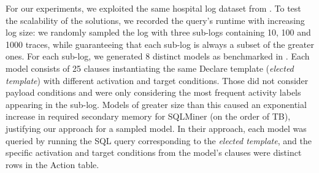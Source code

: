 For our experiments, we exploited the same hospital log dataset from \cite{SchonigRCJM16}. To test the scalability of the solutions, we recorded the query's runtime with increasing log size: we randomly sampled the log with three sub-logs containing 10, 100 and 1000 traces, while guaranteeing that each sub-log is always a subset of the greater ones. For each sub-log, we generated 8 distinct models as benchmarked in \cite{Schonig15}. Each model consists of 25 clauses instantiating the same Declare template (\textit{elected template}) with different activation and target conditions. Those did not consider payload conditions and were only considering the most frequent activity labels appearing in the sub-log. Models of greater size than this caused an exponential increase in required secondary memory for SQLMiner (on the order of TB), justifying our approach for a sampled model. In their approach, each model was queried by running the SQL query corresponding to the \textit{elected template}, and the specific activation and target conditions from the model's clauses were distinct rows in the \textsf{Action} table.



